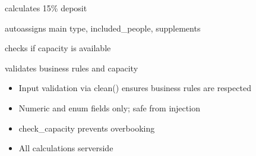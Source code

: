 \documentclass[letterpaper,10pt,french]{sphinxmanual}
\begin{document}
\begin{fulllineitems}
\begin{fulllineitems}
\end{fulllineitems}



\begin{fulllineitems}

\pysigstartsignatures
\pysigline
{}
\pysigstopsignatures
\sphinxAtStartPar
calculates 15\% deposit

\end{fulllineitems}



\begin{fulllineitems}

\pysigstartsignatures
\pysigline
{}
\pysigstopsignatures
\sphinxAtStartPar
auto\sphinxhyphen{}assigns main type, included\_people, supplements

\end{fulllineitems}



\begin{fulllineitems}

\pysigstartsignatures
\pysigline
{}
\pysigstopsignatures
\sphinxAtStartPar
checks if capacity is available

\end{fulllineitems}



\begin{fulllineitems}

\pysigstartsignatures
\pysigline
{}
\pysigstopsignatures
\sphinxAtStartPar
validates business rules and capacity

\end{fulllineitems}

\begin{description}
\begin{itemize}
\item {} 
\sphinxAtStartPar
Input validation via clean() ensures business rules are respected

\item {} 
\sphinxAtStartPar
Numeric and enum fields only; safe from injection

\item {} 
\sphinxAtStartPar
check\_capacity prevents overbooking

\item {} 
\sphinxAtStartPar
All calculations server\sphinxhyphen{}side


\end{itemize}
\end{description}
\end{fulllineitems}
\end{document}

